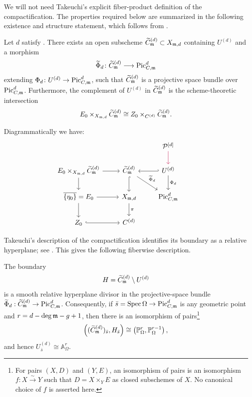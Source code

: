We will not need Takeuchi's explicit fiber-product definition of the
compactification. The properties required below are summarized in the
following existence and structure statement, which follows from
\cite[\S3, (3.9), Proposition~3.7, and Corollary~3.8]{takeuchi2018blow}.

\begin{theorem}[Takeuchi]\label{theorem:takeuchi-compactification-theorem}
    Let $d$ satisfy . There exists an open
    subscheme $\Cmod{d}\subset X_{\mdls,d}$ containing $U^{(d)}$ and a
    morphism
    \[
        \widetilde\Phi_d\colon \Cmod{d}\longrightarrow\PicCm[d]
    \]
    extending $\Phi_d\colon U^{(d)}\to\PicCm[d]$, such that $\Cmod{d}$ is a
    projective space bundle over $\PicCm[d]$.
    Furthermore, the complement of $U^{(d)}$ in $\Cmod{d}$ is the scheme-theoretic intersection
    \[
        E_0 \times_{X_{\mdls,d}} \Cmod{d}
        \cong Z_0 \times_{C^{(d)}} \Cmod{d}.
    \]
\end{theorem}



Diagrammatically we have:
\[
\begin{tikzcd}
    &  & \cP^{[d]} \arrow[d, purple]\\
    E_0 \times_{X_{\mdls,d}} \Cmod{d} \arrow[d] \arrow[r]  & \Cmod{d} \arrow[d, hook] \arrow[rd, "\widetilde\Phi_d"]  & U^{(d)} \arrow[l, hook'] \arrow[d, "\Phi_d"] \\
\overline{\{\eta_0 \}} =  E_0 \arrow[r] \arrow[d] &
X_{\mdls, d} \arrow[d, "\pi"]  &  \PicCm[d] &  \\
Z_0 \arrow[r, hook]           & C^{(d)}
\end{tikzcd}
\]

Takeuchi's description of the compactification identifies its boundary as a
relative hyperplane; see
\cite[Lemmas~3.2 and~3.3(1), Theorem~3.4, (3.9), and
Corollary~3.8]{takeuchi2018blow}. This gives the following fiberwise
description.

\begin{cor}
\label{lemma:geometric-generic-fiber-takeuchi}
The boundary
\[
    H=\Cmod{d}\setminus U^{(d)}
\]
is a smooth relative hyperplane divisor in the projective-space bundle
$\widetilde\Phi_d:\Cmod{d}\to\PicCm[d]$. Consequently, if
$\bar s=\Spec\Omega\to\PicCm[d]$ is any geometric point and
$r=d-\deg\mdls-g+1$, then there is an isomorphism of pairs\footnote{For pairs
$(X,D)$ and $(Y,E)$, an isomorphism of pairs is an isomorphism
$f\colon X\xrightarrow{\sim}Y$ such that
$D=X\times_Y E$ as closed subschemes of $X$. No canonical choice of $f$ is
asserted here.}
\[
    \left((\Cmod{d})_{\bar s},H_{\bar s}\right)
    \cong
    \left(\mathbb P^r_{\Omega},\mathbb P^{r-1}_{\Omega}\right),
\]
and hence $U^{(d)}_{\bar s}\cong\mathbb A^r_{\Omega}$.
\end{cor}

